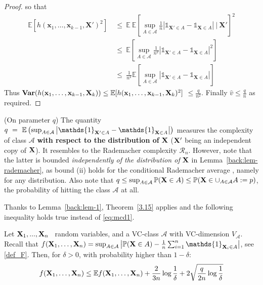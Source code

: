 \begin{proof}
\noindent
so that 
\begin{align*}
\mathbb{E} \left [ h(\mathbf{x}_1,\ldots,\mathbf{x}_{k-1},\mathbf{X}')^2\right] &~\le~ \mathbb{E}~ \mathbb{E} \left [  \sup_{A \in \mathcal{A}} \frac{1}{n} \left | \mathds{1}_{\mathbf{X}' \in A} - \mathds{1}_{\mathbf{X} \in A}  \right| ~\Big|~ \mathbf{X}' \right]^2 \\
&~\le~ \mathbb{E} \left [  \sup_{A \in \mathcal{A}} \frac{1}{n^2} \left | \mathds{1}_{\mathbf{X}' \in A} - \mathds{1}_{\mathbf{X} \in A}  \right|^2 \right] \\
&~\le~ \frac{1}{n^2} \mathbb{E} \left [  \sup_{A \in \mathcal{A}}  \left | \mathds{1}_{\mathbf{X}' \in A} - \mathds{1}_{\mathbf{X} \in A}  \right|  \right] 
\end{align*}
\noindent
Thus $\mathbf{Var}(h(\mathbf{x}_1,\ldots,\mathbf{x}_{k-1},\mathbf{X}_k)) \le \mathbb{E} [h(\mathbf{x}_1,\ldots,\mathbf{x}_{k-1},\mathbf{X}_k)^2]$ $ \le \frac{q}{n^2}$. Finally $\hat v \le \frac{q}{n}$ as required.
\end{proof}

\begin{remark}({\sc On parameter} $q$)
The quantity $q~=~ \mathbb{E}\left ( \sup_{A \in \mathcal{A}} \left | \mathds{1}_{\mb X' \in A} - \mathds{1}_{\mb X \in A} \right|\right)$ measures the complexity of class $\mathcal{A}$ \textbf{with respect to the distribution of} $\mathbf X$ ($\mathbf X'$ being an independent copy of $\mathbf X$). It resembles to the Rademacher complexity $\mathcal{R}_n$. %
However, note that the latter is bounded \emph{independently of the distribution of} $\mathbf X$ in Lemma~\ref{back:lem-rademacher}, as bound (ii)  holds for the conditional Rademacher average%
, namely for any distribution.
%
Also note that $q \le \sup_{A \in \mathcal{A}} \mathbb{P}(\mathbf X \in A) \le \mathbb{P}(\mathbf X \in \cup_{A \in \mathcal{A}}A :=p) $, the probability of hitting the class $\mathcal{A}$ at all.
\end{remark}

Thanks to Lemma~\ref{back:lem-1}, Theorem~\ref{3.15} applies and the following inequality holds true instead of \eqref{eq:mcd1}.

\begin{proposition}
\label{TVCsharp}
Let $\mathbf X_1,...,\mathbf X_n$ \iid~random variables, and a VC-class $\mathcal{A}$ with VC-dimension $V_{\mathcal{A}}$. 
Recall that $f(\mb X_1,\ldots,\mb X_n) = \sup_{A \in \mathcal{A}} \left | \mathbb{P}(\mb X \in A) - \frac{1}{n} \sum_{i=1}^n \mathds{1}_{\mb X_i \in A} \right|$, see \eqref{def_F}. Then, for $\delta>0$, with probability higher than $1-\delta$:
\begin{align}
\label{eq:mcd1improved}
f(\mathbf X_1,\ldots,\mathbf X_n) \le \mathbb{E}f(\mathbf X_1,\ldots,\mathbf X_n) + \frac{2}{3n} \log{\frac{1}{\delta}} + 2\sqrt{\frac{q}{2n} \log{\frac{1}{\delta}}}
\end{align}
\end{proposition}

